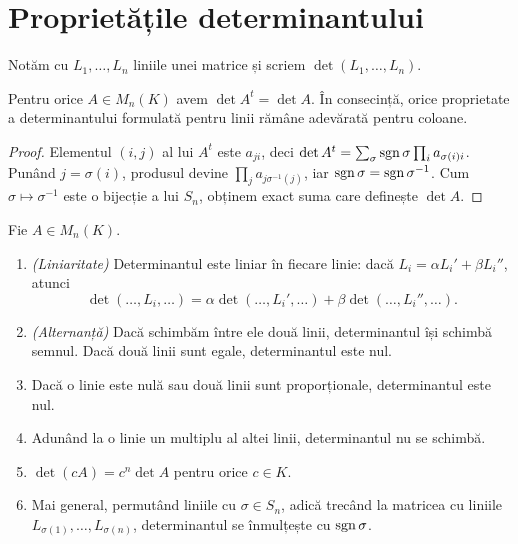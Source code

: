 \section{Proprietățile determinantului}

Notăm cu $L_1,\dots,L_n$ liniile unei matrice și scriem $\det(L_1,\dots,L_n)$.

\begin{propozitie}\label{prop:dettranspusa}
Pentru orice $A\in M_n(K)$ avem $\det A^t=\det A$. În consecință, orice proprietate a determinantului formulată pentru linii rămâne adevărată pentru coloane.
\end{propozitie}

\begin{proof}
Elementul $(i,j)$ al lui $A^t$ este $a_{ji}$, deci $\det A^t=\sum_{\sigma}\operatorname{sgn}\sigma\prod_i a_{\sigma(i)i}$. Punând $j=\sigma(i)$, produsul devine $\prod_j a_{j\sigma^{-1}(j)}$, iar $\operatorname{sgn}\sigma=\operatorname{sgn}\sigma^{-1}$. Cum $\sigma\mapsto\sigma^{-1}$ este o bijecție a lui $S_n$, obținem exact suma care definește $\det A$.
\end{proof}

\begin{propozitie}\label{prop:detproprietati}
Fie $A\in M_n(K)$.
\begin{enumerate}
\item \emph{(Liniaritate)} Determinantul este liniar în fiecare linie: dacă $L_i=\alpha L_i'+\beta L_i''$, atunci
\[
\det(\dots,L_i,\dots)=\alpha\det(\dots,L_i',\dots)+\beta\det(\dots,L_i'',\dots).
\]
\item \emph{(Alternanță)} Dacă schimbăm între ele două linii, determinantul își schimbă semnul. Dacă două linii sunt egale, determinantul este nul.
\item Dacă o linie este nulă sau două linii sunt proporționale, determinantul este nul.
\item Adunând la o linie un multiplu al altei linii, determinantul nu se schimbă.
\item $\det(cA)=c^n\det A$ pentru orice $c\in K$.
\item Mai general, permutând liniile cu $\sigma\in S_n$, adică trecând la matricea cu liniile $L_{\sigma(1)},\dots,L_{\sigma(n)}$, determinantul se înmulțește cu $\operatorname{sgn}\sigma$.
\end{enumerate}
\end{propozitie}


